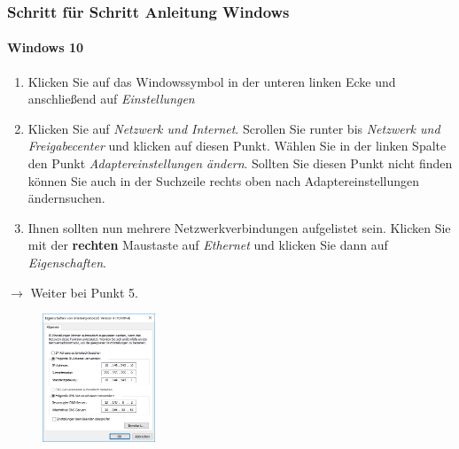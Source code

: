 \documentclass[a4paper,12pt]{scrartcl}
\begin{document}
\subsubsection*{Schritt für Schritt Anleitung Windows}

\paragraph*{Windows 10}
\begin{enumerate}
	\item Klicken Sie auf das Windowssymbol in der unteren linken Ecke und anschließend auf \emph{Einstellungen}
	\item Klicken Sie auf \textit{Netzwerk und Internet}. Scrollen Sie runter bis \textit{Netzwerk und Freigabecenter} und klicken auf diesen Punkt. Wählen Sie in der linken Spalte den Punkt \textit{Adaptereinstellungen ändern}. Sollten Sie diesen Punkt nicht finden können Sie auch in der Suchzeile rechts oben nach \glqq Adaptereinstellungen ändern\grqq suchen.

    \item Ihnen sollten nun mehrere Netzwerkverbindungen aufgelistet sein. Klicken Sie mit der \textbf{rechten} Maustaste auf \textit{Ethernet} und klicken Sie dann auf \textit{Eigenschaften}.
\end{enumerate}
$\rightarrow$ Weiter bei Punkt 5.


\begin{figure}
\centering
  \includegraphics[width=0.3\textwidth]{Bilder/IP_Windows_mb}
\end{figure}
\end{document}
